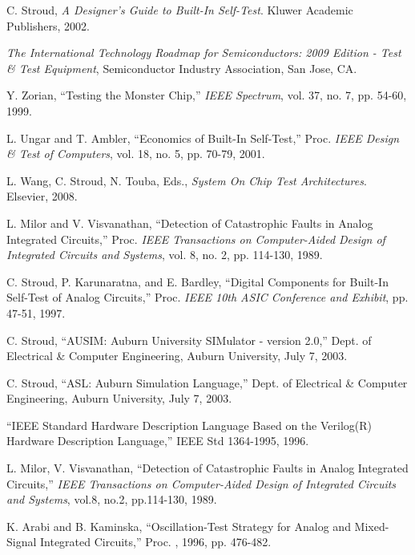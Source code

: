 \documentclass[12pt]{report}
\begin{document}
\begin{thebibliography}{99}

 C. Stroud, \textit{A Designer's Guide to Built-In Self-Test}. Kluwer Academic Publishers, 2002.

 \textit{The International Technology Roadmap for Semiconductors: 2009 Edition - Test \& Test Equipment}, Semiconductor Industry Association, San Jose, CA.

 Y. Zorian, ``Testing the Monster Chip,'' \textit{IEEE Spectrum}, vol. 37, no. 7, pp. 54-60, 1999.

 L. Ungar and T. Ambler, ``Economics of Built-In Self-Test,'' Proc. \textit{IEEE Design \& Test of Computers}, vol. 18, no. 5, pp. 70-79, 2001. 

 L. Wang, C. Stroud, N. Touba, Eds., \textit{System On Chip Test Architectures}. Elsevier, 2008.

 L. Milor and V. Visvanathan, ``Detection of Catastrophic Faults in Analog Integrated Circuits,'' Proc. \textit{IEEE Transactions on Computer-Aided Design of Integrated Circuits and Systems}, vol. 8, no. 2, pp. 114-130, 1989.

 C. Stroud, P. Karunaratna, and E. Bardley, ``Digital Components for Built-In Self-Test of Analog Circuits,'' Proc. \textit{IEEE 10th ASIC Conference and Exhibit}, pp. 47-51, 1997.

 C. Stroud, ``AUSIM: Auburn University SIMulator - version 2.0,'' Dept. of Electrical \& 
Computer Engineering, Auburn University, July 7, 2003.

 C. Stroud, ``ASL: Auburn Simulation Language,'' Dept. of Electrical \& Computer
Engineering, Auburn University, July 7, 2003.

 ``IEEE Standard Hardware Description Language Based on the Verilog(R) Hardware Description Language,'' IEEE Std 1364-1995, 1996.

 L. Milor, V. Visvanathan, ``Detection of Catastrophic Faults in Analog Integrated Circuits,'' \textit{IEEE Transactions on Computer-Aided Design of Integrated Circuits and Systems}, vol.8, no.2, pp.114-130, 1989.

 K. Arabi and B. Kaminska, ``Oscillation-Test Strategy for Analog and Mixed-Signal Integrated Circuits,'' Proc. ,  1996, pp. 476-482.


\end{thebibliography}
\end{document}
